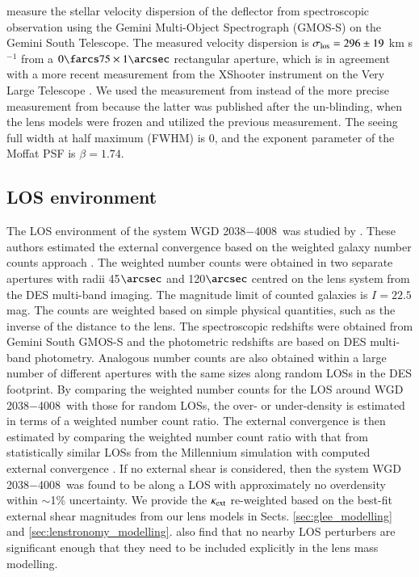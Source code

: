 \documentclass[longauth]{aa}
\newcommand{\lensname}{WGD 2038$-$4008}
\newcommand{\ajs}[1]{{{#1}}}
\newcommand{\ajsiv}[1]{{{#1}}}
\newcommand{\reply}[1]{{{#1}}}
\begin{document}
\citet{Buckley-Geer20} measure the stellar velocity dispersion of the deflector from spectroscopic observation using the Gemini Multi-Object Spectrograph (GMOS-S) on the Gemini South Telescope. The measured velocity dispersion is $\sigma_{\rm los} = 296 \pm 19$ km s$^{-1}$ from a $0\farcs75\times1\arcsec$ rectangular \ajsiv{aperture}\ajs{, which is in agreement with a more recent measurement from the XShooter instrument on the Very Large Telescope \citep[VLT;][]{Melo21}}. \reply{We used the measurement from \citet{Buckley-Geer20} instead of the more precise measurement from \citet{Melo21} because the latter was published after the un-blinding, when the lens models were frozen and utilized the previous measurement.} The seeing full width at half maximum (FWHM) is 0, and the exponent parameter of the Moffat PSF is $\beta=1.74$. 

\subsection{LOS environment} \label{sec:kappa_ext_measurement}

The LOS environment of the system \lensname\ was studied by \citet{Buckley-Geer20}. These authors estimated the external convergence based on the weighted galaxy number counts approach \citep{Greene13, Rusu17, Birrer19b, Rusu20}. The weighted number counts were obtained in two separate apertures with radii 45$\arcsec$ and 120$\arcsec$ centred on the lens system \ajs{from the DES multi-band imaging}. The magnitude limit of counted galaxies is $I = 22.5$ mag. The counts are weighted based on simple physical quantities, such as the inverse of the distance to the lens. \ajs{The spectroscopic redshifts were obtained from Gemini South GMOS-S and the photometric redshifts are based on DES multi-band photometry.} Analogous number counts are also obtained within a large number of different apertures with the same sizes along random LOSs in the DES footprint. By comparing the weighted number counts for the LOS around \lensname\ \ajsiv{with those} for random LOSs, the over- or under-density is estimated in terms of a weighted number count ratio. The external convergence is then estimated by comparing the weighted number count ratio with that from statistically similar LOSs from the Millennium simulation with computed external convergence \citep{Springel05, Hilbert09}. \ajs{If no external shear is considered, then the system \lensname\ was found to be along a LOS with approximately no overdensity within $\sim$1\% uncertainty. We provide the $\kappa_{\rm ext}$ \ajsiv{re-weighted based on the best-fit external shear magnitudes from our lens models} in Sects. \ref{sec:glee_modelling} and \ref{sec:lenstronomy_modelling}.} \citet{Buckley-Geer20} also find that no nearby LOS perturbers are significant enough that they need to be included explicitly in the lens mass modelling.
\end{document}
